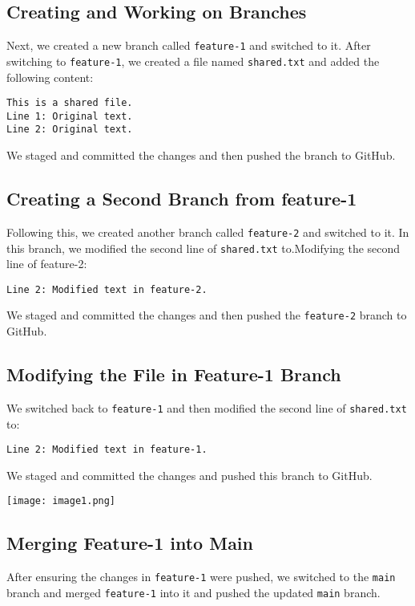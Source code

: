 \documentclass[a4paper,12pt]{article}
\begin{document}
\subsection{ Creating and Working on Branches}
Next, we created a new branch called \texttt{feature-1} and switched to it. After switching to \texttt{feature-1}, we created a file named \texttt{shared.txt} and added the following content:
\begin{verbatim}
This is a shared file.
Line 1: Original text.
Line 2: Original text.
\end{verbatim}
We staged and committed the changes and then pushed the branch to GitHub.

\subsection{Creating a Second Branch from feature-1}
Following this, we created another branch called \texttt{feature-2} and switched to it. In this branch, we modified the second line of \texttt{shared.txt} to.Modifying the second line of feature-2:
\begin{verbatim}
Line 2: Modified text in feature-2.
\end{verbatim}
We staged and committed the changes and then pushed the \texttt{feature-2} branch to GitHub.

\subsection{Modifying the File in Feature-1 Branch}
We switched back to \texttt{feature-1} and then modified the second line of \texttt{shared.txt} to:
\begin{verbatim}
Line 2: Modified text in feature-1.
\end{verbatim}
We staged and committed the changes and pushed this branch to GitHub.

\begin{center}
\texttt{[image: image1.png]}
    \vspace{0.5cm}
\end{center}

\subsection{Merging Feature-1 into Main}
After ensuring the changes in \texttt{feature-1} were pushed, we switched to the \texttt{main} branch and merged \texttt{feature-1} into it and pushed the updated \texttt{main} branch.
\end{document}
